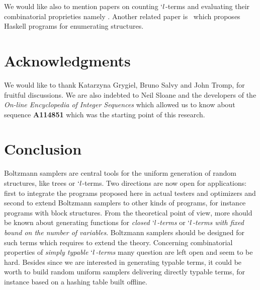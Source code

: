 \documentclass{sig-alternate}
\begin{document}
We would like also to mention papers on counting
\mbox{$`l$-terms} \cite{DBLP:journals/tcs/Lescanne13,DBLP:journals/jfp/GrygielL13} and
evaluating their combinatorial proprieties
namely \cite{bodini11:_lambd_bound_unary_heigh,DBLP:journals/corr/abs-0903-5505,DBLP:journals/combinatorics/BodiniGGJ13,DBLP:journals/tcs/BodiniGJ13}.
Another related paper is~\cite{DBLP:conf/haskell/DuregardJW12} which proposes
\textsf{Haskell} programs for enumerating structures.

\section{Acknowledgments}

We would like to thank Katarzyna Grygiel, Bruno Salvy and John Tromp,
for fruitful discussions.  We are also indebted to Neil Sloane and the developers of
the \emph{On-line Encyclopedia of Integer Sequences} which allowed us to know about
sequence \textbf{A114851} which was the starting point of this research.

\section{Conclusion}

Boltzmann samplers are central tools for the uniform generation of random
structures, like trees or $`l$-terms.  Two directions are now open for applications:
first to integrate the programs proposed here in actual testers and optimizers and
second to extend Boltzmann samplers to other kinds of programs, for instance programs
with block structures. From the theoretical point of view, more should be known about
generating functions for \emph{closed $`l$-terms} or \emph{$`l$-terms with fixed bound on the
number of variables}.  Boltzmann samplers should be designed for such terms which
requires to extend the theory. Concerning combinatorial properties of \emph{simply typable
$`l$-terms} many question are left open and seem to be hard. Besides since we are interested
in generating typable terms, it could be worth to build random uniform samplers
 delivering directly typable terms, for instance based on a hashing table built offline. 
\end{document}
